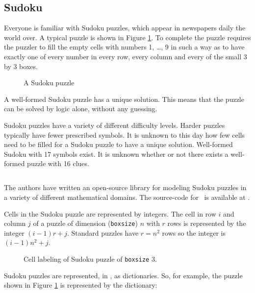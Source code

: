 \subsection{Sudoku}

Everyone is familiar with Sudoku puzzles, which appear in newspapers daily the world over. A typical puzzle is shown in Figure \ref{sudokuexampleone}. To complete the puzzle requires the puzzler to fill the empty cells with numbers 1, \ldots , 9 in such a way as to have exactly one of every number in every row, every column and every of the small 3 by 3 boxes.

\begin{figure}[h]
\label{sudokuexampleone}
\centering
  \sudokuexampleone
\caption{A Sudoku puzzle}
\end{figure}

A well-formed Sudoku puzzle has a unique solution. This means that the puzzle can be solved by logic alone, without any guessing.

Sudoku puzzles have a variety of different difficulty levels. Harder puzzles typically have fewer prescribed symbols. It is unknown to this day how few cells need to be filled for a Sudoku puzzle to have a unique solution. Well-formed Sudoku with 17 symbols exist. It is unknown whether or not there exists a well-formed puzzle with 16 clues.

\subsection{\libname}

The authors have written an open-source library for modeling Sudoku puzzles in a variety of different mathematical domains. The source-code for \libname\ is available at \libwebsite.

Cells in the Sudoku puzzle are represented by integers. The cell in row $i$ and column $j$ of a puzzle of dimension (\texttt{boxsize}) $n$ with $r$ rows is represented by the integer $(i - 1)r + j$. Standard puzzles have $r = n^2$ rows so the integer is $(i - 1)n^2 + j$. 

\begin{figure}[h]
\label{sudokulabeling}
\centering
  \sudokulabeling
\caption{Cell labeling of Sudoku puzzle of \texttt{boxsize} 3.}
\end{figure}

Sudoku puzzles are represented, in \libname, as dictionaries. So, for example, the puzzle shown in Figure \ref{sudokuexampleone} is represented by the dictionary:

